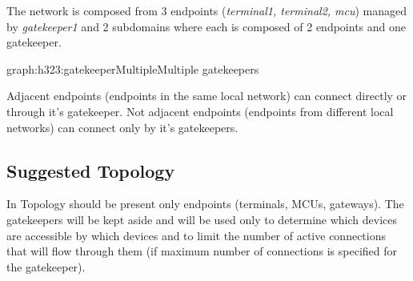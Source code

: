\documentclass[a4paper]{report}
\begin{document}
The network is composed from 3 endpoints (\emph{terminal1, terminal2, mcu}) managed by \emph{gatekeeper1} and 2 subdomains where each is composed of 2 endpoints and one gatekeeper.%
\begin{Graph}{graph:h323:gatekeeperMultiple}{Multiple gatekeepers}
  

     
  

\end{Graph}%
Adjacent endpoints (endpoints in the same local network) can connect directly or through it's gatekeeper. Not adjacent endpoints (endpoints from different local networks) can connect only by it's gatekeepers.

\subsection{Suggested Topology}
In Topology should be present only endpoints (terminals, MCUs, gateways). The gatekeepers will be kept aside and will be used only to determine which devices are accessible by which devices and to limit the number of active connections that will flow through them (if maximum number of connections is specified for the gatekeeper).
\end{document}
